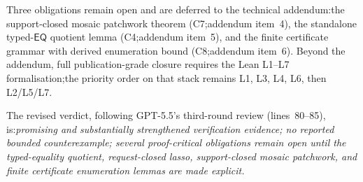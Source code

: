 \documentclass[11pt]{article}
\newcommand{\EQ}{\mathsf{EQ}}
\begin{document}
Three obligations remain open and are deferred to the technical
addendum:\@ the support-closed mosaic patchwork theorem
(C7;\@ addendum item~4), the standalone typed-\(\EQ\) quotient
lemma (C4;\@ addendum item~5), and the finite certificate grammar
with derived enumeration bound (C8;\@ addendum item~6).  Beyond
the addendum, full publication-grade closure requires the Lean
L1--L7 formalisation;\@ the priority order on that stack remains
L1, L3, L4, L6, then L2/L5/L7.

The revised verdict, following GPT-5.5's third-round review
(lines~80--85), is:\@ \emph{promising and substantially
strengthened verification evidence; no reported bounded
counterexample; several proof-critical obligations remain open
until the typed-equality quotient, request-closed lasso,
support-closed mosaic patchwork, and finite certificate
enumeration lemmas are made explicit.}
\end{document}
